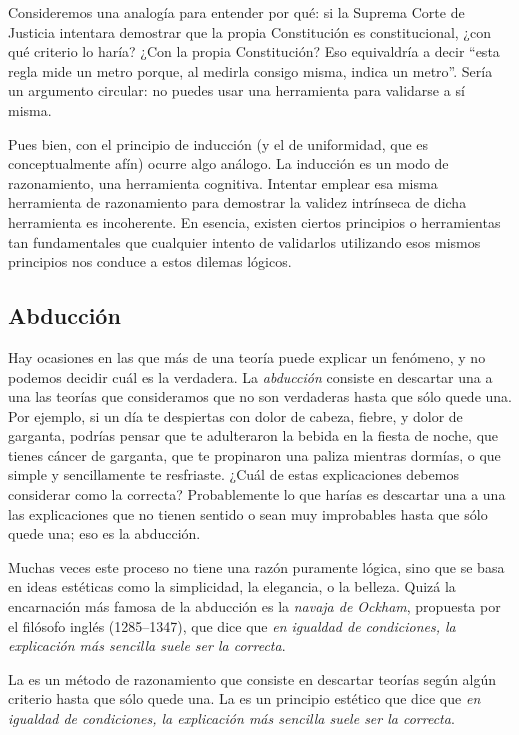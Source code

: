 Consideremos una analogía para entender por qué: si la Suprema Corte de Justicia intentara demostrar que la propia Constitución es constitucional, ¿con qué criterio lo haría? ¿Con la propia Constitución? Eso equivaldría a decir “esta regla mide un metro porque, al medirla consigo misma, indica un metro”. Sería un argumento circular: no puedes usar una herramienta para validarse a sí misma.

Pues bien, con el principio de inducción (y el de uniformidad, que es conceptualmente afín) ocurre algo análogo.
La inducción es un modo de razonamiento, una herramienta cognitiva.
Intentar emplear esa misma herramienta de razonamiento para demostrar la validez intrínseca de dicha herramienta es incoherente.
En esencia, existen ciertos principios o herramientas tan fundamentales que cualquier intento de validarlos utilizando esos mismos principios nos conduce a estos dilemas lógicos.

\subsection*{Abducción}
\label{sub:abduccion}
Hay ocasiones en las que más de una teoría puede explicar un fenómeno, y no podemos decidir cuál es la verdadera.
La  \emph{abducción} consiste en descartar una a una las teorías que consideramos que no son verdaderas hasta que sólo quede una.
Por ejemplo, si un día te despiertas con dolor de cabeza, fiebre, y dolor de garganta, podrías pensar que te adulteraron la bebida en la fiesta de noche, que tienes cáncer de garganta, que te propinaron una paliza mientras dormías, o que simple y sencillamente te resfriaste.
¿Cuál de estas explicaciones debemos considerar como la correcta?
Probablemente lo que harías es descartar una a una las explicaciones que no tienen sentido o sean muy improbables hasta que sólo quede una; eso es la abducción.

Muchas veces este proceso no tiene una razón puramente lógica, sino que se basa en ideas estéticas como la simplicidad, la elegancia, o la belleza.
Quizá la encarnación más famosa de la abducción es la \emph{navaja de Ockham}, propuesta por el filósofo inglés  (1285--1347), que dice que \emph{en igualdad de condiciones, la explicación más sencilla suele ser la correcta}.

\begin{remember}
	\label{rem:abduccion}
	La  es un método de razonamiento que consiste en
	descartar teorías según algún criterio hasta que sólo quede una.
	La  es un principio estético que dice que
	\emph{en igualdad de condiciones, la explicación más sencilla suele ser la
		correcta}.
\end{remember}

